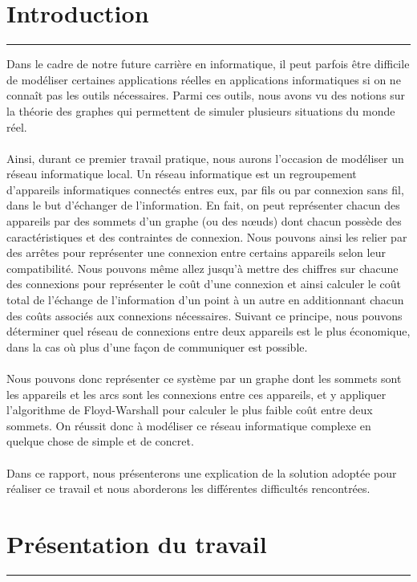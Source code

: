 \documentclass[10pt,letterpaper]{article}
\begin{document}
\section{Introduction}
\hrule
\vspace{1em}
Dans le cadre de notre future carrière en informatique, il peut parfois être difficile de modéliser 
certaines applications réelles en applications informatiques si on ne connaît pas les outils nécessaires. 
Parmi ces outils, nous avons vu des notions sur la théorie des graphes qui permettent de simuler plusieurs situations du monde réel.\\
\\
Ainsi, durant ce premier travail pratique, nous aurons l’occasion de modéliser un réseau informatique local. 
Un réseau informatique est un regroupement d’appareils informatiques connectés entres eux, 
par fils ou par connexion sans fil, dans le but d’échanger de l’information. 
En fait, on peut représenter chacun des appareils par des sommets d’un graphe (ou des nœuds) dont chacun possède des caractéristiques et des contraintes de connexion. 
Nous pouvons ainsi les relier par des arrêtes pour représenter une connexion entre certains appareils selon leur compatibilité. 
Nous pouvons même allez jusqu’à mettre des chiffres sur chacune des connexions pour représenter le coût d’une connexion 
et ainsi calculer le coût total de l’échange de l’information d’un point à un autre en additionnant chacun des coûts associés aux connexions nécessaires. 
Suivant ce principe, nous pouvons déterminer quel réseau de connexions entre deux appareils est le plus économique, 
dans la cas où plus d’une façon de communiquer est possible.\\
\\
Nous pouvons donc représenter ce système par un graphe dont les sommets sont les appareils et les arcs sont les connexions entre ces appareils, 
et y appliquer l’algorithme de Floyd-Warshall pour calculer le plus faible coût entre deux sommets. 
On réussit donc à modéliser ce réseau informatique complexe en quelque chose de simple et de concret.\\
\\
Dans ce rapport, nous présenterons une explication de la solution adoptée pour réaliser ce travail et nous aborderons les différentes difficultés rencontrées.



\newpage
\section{Présentation du travail}
\hrule
\vspace{1em}
\lipsum[1]~\\
\lipsum[2]~\\
\lipsum[3]
\end{document}
